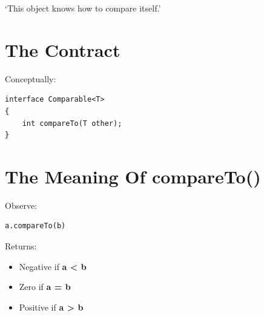 \documentclass[11pt,a4paper]{book}
\begin{document}
`This object knows how
to compare itself.'


\section{The Contract}

Conceptually:

\begin{verbatim} 
interface Comparable<T>
{
    int compareTo(T other);
}
\end{verbatim}




\section{The Meaning Of compareTo()}

Observe:

\begin{verbatim} 
a.compareTo(b)
\end{verbatim}


Returns:
\begin{itemize}
\item \textcolor{RosettaOrange}{Negative}
if \textcolor{RosettaBlue}{\textbf{ a < b }}

\item Zero
if \textcolor{RosettaBlue}{\textbf{ a = b }}

\item \textcolor{RosettaGreen}{Positive}
if \textcolor{RosettaBlue}{\textbf{ a > b }}
\end{itemize}





\end{document}
